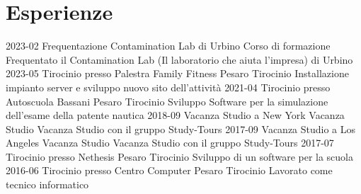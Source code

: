\documentclass[icon]{twentysecondcv}
\begin{document}
	\section{Esperienze}
	\begin{twenty}
		\twentyitem
		{2023-02}
		{Frequentazione Contamination Lab di Urbino}
		{Corso di formazione}
		{Frequentato il Contamination Lab (Il laboratorio che aiuta l'impresa) di Urbino}
		\twentyitem
		{2023-05}
		{Tirocinio presso Palestra Family Fitness Pesaro}
		{Tirocinio}
		{Installazione impianto server e sviluppo nuovo sito dell'attività}
		\twentyitem
		{2021-04}
		{Tirocinio presso Autoscuola Bassani Pesaro}
		{Tirocinio}
		{Sviluppo Software per la simulazione dell'esame della patente nautica}
		\twentyitem
		{2018-09}
		{Vacanza Studio a New York}
		{Vacanza Studio}
		{Vacanza Studio con il gruppo Study-Tours}
		\twentyitem
		{2017-09}
		{Vacanza Studio a Los Angeles}
		{Vacanza Studio}
		{Vacanza Studio con il gruppo Study-Tours}
		\twentyitem
		{2017-07}
		{Tirocinio presso Nethesis Pesaro}
		{Tirocinio}
		{Sviluppo di un software per la scuola}
		\twentyitem
		{2016-06}
		{Tirocinio presso Centro Computer Pesaro}
		{Tirocinio}
		{Lavorato come tecnico informatico}
	\end{twenty}
	
	
	
\end{document}
